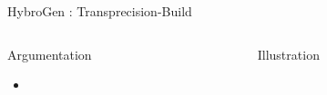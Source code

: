 \begin{Frame}{HybroGen : Transprecision-Build}
 \begin{columns}[t]
  \begin{column}{\BW}
    \begin{block}{Argumentation}
      \begin{itemize}
        \item
      \end{itemize}
    \end{block}
  \end{column}
  \begin{column}{\BW}
    \begin{block}{Illustration}
    \end{block}
  \end{column}

 \end{columns}
\end{Frame}
